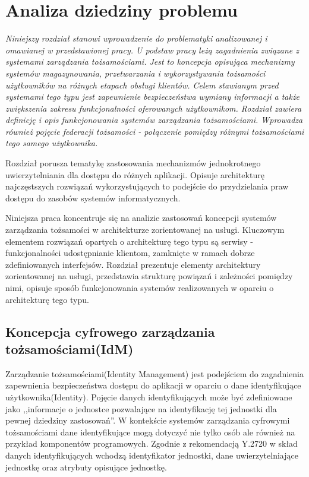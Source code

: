 \chapter{Analiza dziedziny problemu}
\label{cha:analizaDziedzinyProblemu}

{\it
	Niniejszy rozdział stanowi wprowadzenie do problematyki analizowanej i omawianej w przedstawionej pracy. U podstaw pracy leżą zagadnienia związane z  systemami zarządzania tożsamościami. Jest to koncepcja opisująca mechanizmy systemów magazynowania, przetwarzania i wykorzystywania tożsamości użytkowników na różnych etapach obsługi klientów. Celem stawianym przed systemami tego typu jest zapewnienie bezpieczeństwa wymiany informacji a także zwiększenia zakresu funkcjonalności oferowanych użytkownikom. Rozdział zawiera definicję i opis funkcjonowania systemów zarządzania tożsamościami. Wprowadza również pojęcie federacji tożsamości - połączenie pomiędzy różnymi tożsamościami tego samego użytkownika. 

	Rozdział porusza tematykę zastosowania mechanizmów jednokrotnego uwierzytelniania dla dostępu do różnych aplikacji. Opisuje architekturę najczęstszych rozwiązań wykorzystujących to podejście do przydzielania praw dostępu do zasobów systemów informatycznych. 

	Niniejsza praca koncentruje się na analizie zastosowań koncepcji systemów zarządzania tożsamości w architekturze zorientowanej na usługi. Kluczowym elementem rozwiązań opartych o architekturę tego typu są serwisy - funkcjonalności udostępnianie  klientom, zamknięte w ramach dobrze zdefiniowanych interfejsów. Rozdział prezentuje elementy architektury zorientowanej na usługi, przedstawia strukturę powiązań i zależności pomiędzy nimi, opisuje sposób funkcjonowania systemów realizowanych w oparciu o architekturę tego typu. 

}


\section{Koncepcja cyfrowego zarządzania tożsamościami(IdM)}
\label{sec:konceptcjaIdM}

	Zarządzanie tożsamościami(Identity Management) jest podejściem do zagadnienia zapewnienia bezpieczeństwa dostępu do aplikacji w oparciu o dane identyfikujące użytkownika(Identity). Pojęcie danych identyfikujących może być zdefiniowane jako ,,informacje o jednostce pozwalające na identyfikację tej jednostki dla pewnej dziedziny zastosowań''\cite{Itu09}. W kontekście systemów zarządzania cyfrowymi tożsamościami dane identyfikujące mogą dotyczyć nie tylko osób ale również na przykład komponentów programowych\cite{Bertino11}. Zgodnie z rekomendacją Y.2720 w skład danych identyfikujących wchodzą identyfikator jednostki, dane uwierzytelniające jednostkę oraz atrybuty opisujące jednostkę\cite{Itu09}.

